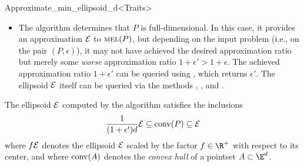 \begin{ccRefClass}{Approximate_min_ellipsoid_d<Traits>}
\begin{itemize}
  \emph{Important note:} due to rounding errors, the algorithm cannot
  in all cases decide correctly whether $P$ is full-dimensional or
  not.  If  returns , the points
  lie in such a ``thin'' subspace of $\E^d$ that the algorithm is
  incapable of computing an approximation to $\mel(P)$.  More
  precisely, if  returns , there
  exist two parallel hyperplanes in $\E^d$ with the points $P$ in
  between so that the distance $\delta$ between the hyperplanes is
  very small, possible zero. (If $\delta=0$ then $P$ is not
  full-dimensional.)

  If $P$ is not full-dimensional, linear algebra techniques should be
  used to determine an affine subspace $S$ of $\E^d$ that contains the
  points $P$ as a (w.r.t.\ $S$) full-dimensional pointset; once $S$ is
  determined, the algorithm can be invoked again to compute an
  approximation to (the lower-dimensional) $\mel(P)$ in $S$.  Since
   might (due to rounding errors, see
  above) return  even though $P$ is full-dimensional, the
  lower-dimensional subspace $S$ containing $P$ need not exist.
  Therefore, it might be more advisable to fit a hyperplane $H$
  through the pointset $P$, project $P$ onto this affine subspace $H$,
  and compute an approximation to the minimum-volume enclosing
  ellipsoid of the projected points within $H$; the fitting can be
  done for instance using the 
  function from the \cgal\ package .
\item The algorithm determines that $P$ is full-dimensional.  In this
  case, it provides an approximation ${\cal E}$ to $\mel(P)$, but
  depending on the input problem (i.e., on the pair $(P,\epsilon)$),
  it may not have achieved the desired approximation ratio but merely
  some \emph{worse} approximation ratio $1+\epsilon'>1+\epsilon$.  The
  achieved approximation ratio $1+\epsilon'$ can be queried using
  , which returns $\epsilon'$. The ellipsoid
  ${\cal E}$ itself can be queried via the methods
  , , and
  .
\end{itemize}

The ellipsoid ${\cal E}$ computed by the algorithm satisfies the inclusions
\begin{equation}
  \label{eq:approximate_min_ellipsoid_incl}
\frac{1}{(1+\epsilon')d} {\cal E} \subseteq \mathop{\rm
conv}\nolimits(P) \subseteq {\cal E}
\end{equation}
where $f {\cal E}$ denotes the ellipsoid ${\cal E}$ scaled by the
factor $f\in\R^+$ with respect to its center, and where $\mathop{\rm
conv}\nolimits(A)$ denotes the \emph{convex hull} of a pointset
$A\subset \E^d$.


\end{ccRefClass}
